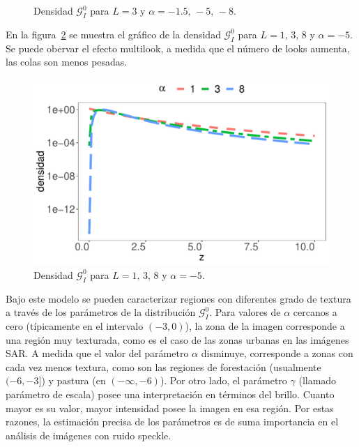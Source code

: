 \begin{figure}[hbt]
	\centering    
	\caption{\label{DensidadGI0L03}Densidad $\mathcal{G}_I^0$ para $L=3$ y $\alpha=-1.5, \, -5, \, -8$.}
\end{figure} 

En la figura~\ref{DensidadGI0TodoL} se muestra el gráfico de la densidad $\mathcal{G}_I^0$ para $L=1, \, 3, \, 8$ y $\alpha= -5$. Se puede obervar el efecto multilook, a medida que el número de looks aumenta, las colas son menos pesadas.

\begin{figure}[hbt]
	\centering    
	\includegraphics[width=.44\linewidth]{../../Figures/Tesis/Capitulo4/DensGI0_TodoL_Semilog.pdf}
	\caption{\label{DensidadGI0TodoL}Densidad $\mathcal{G}_I^0$ para $L=1, \, 3, \, 8$ y $\alpha= -5$.}
\end{figure} 

Bajo este modelo se pueden caracterizar regiones con diferentes grado de textura a través de los parámetros de la distribución $\mathcal{G}_I^{0}$. Para valores de $\alpha$ cercanos a cero (típicamente en el intervalo $(-3,0)$), la zona de la imagen corresponde a una región muy texturada, como es el caso de las zonas urbanas en las imágenes SAR. A medida que el valor del parámetro $\alpha$ disminuye, corresponde a zonas con cada vez menos textura, como son las regiones de forestación (usualmente $(-6,-3]$) y pastura (en $(-\infty,-6)$). Por otro lado, el parámetro $\gamma$ (llamado parámetro de escala) posee una interpretación en términos del brillo. Cuanto mayor es su valor, mayor intensidad posee la imagen en esa región. Por estas razones, la estimación precisa de los parámetros es de suma importancia en el análisis de imágenes con ruido speckle. 



